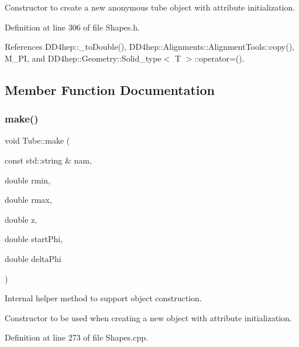 Constructor to create a new anonymous tube object with attribute initialization. 



Definition at line 306 of file Shapes.\+h.



References D\+D4hep\+::\+\_\+to\+Double(), D\+D4hep\+::\+Alignments\+::\+Alignment\+Tools\+::copy(), M\+\_\+\+PI, and D\+D4hep\+::\+Geometry\+::\+Solid\+\_\+type$<$ T $>$\+::operator=().



\subsection{Member Function Documentation}
\hypertarget{class_d_d4hep_1_1_geometry_1_1_tube_a2c8ae5a41c16a7b35c4c6ab8894eaf9b}{}\label{class_d_d4hep_1_1_geometry_1_1_tube_a2c8ae5a41c16a7b35c4c6ab8894eaf9b} 
\subsubsection{\texorpdfstring{make()}{make()}}
{\footnotesize\ttfamily void Tube\+::make (\begin{DoxyParamCaption}\item[{const std\+::string \&}]{nam,  }\item[{double}]{rmin,  }\item[{double}]{rmax,  }\item[{double}]{z,  }\item[{double}]{start\+Phi,  }\item[{double}]{delta\+Phi }\end{DoxyParamCaption})\hspace{0.3cm}{\ttfamily [protected]}}



Internal helper method to support object construction. 

Constructor to be used when creating a new object with attribute initialization. 

Definition at line 273 of file Shapes.\+cpp.

\hypertarget{class_d_d4hep_1_1_geometry_1_1_tube_a290f92c3bb4585c77e775460412fea42}{}\label{class_d_d4hep_1_1_geometry_1_1_tube_a290f92c3bb4585c77e775460412fea42} 
